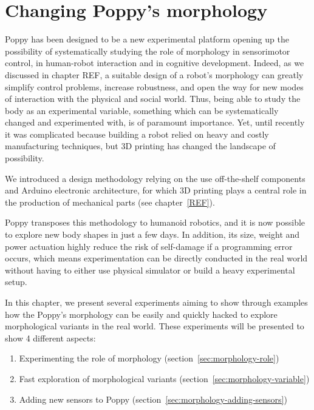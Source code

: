 
\cleartoleftpage



\chapter{Changing Poppy's morphology} %
\label{cha:changing_morphology}


Poppy has been designed to be a new experimental platform opening up the possibility of systematically studying the role of morphology in sensorimotor control, in human-robot interaction and in cognitive development. Indeed, as we discussed in chapter REF, a suitable design of a robot’s morphology can greatly simplify control problems, increase robustness, and open the way for new modes of interaction with the physical and social world. Thus, being able to study the body as an experimental variable, something which can be systematically changed and experimented with, is of paramount importance. Yet, until recently it was complicated because building a robot relied on heavy and costly manufacturing techniques, but 3D printing has changed the landscape of possibility.

We introduced a design methodology relying on the use off-the-shelf components and Arduino electronic architecture, for which 3D printing plays a central role in the production of mechanical parts (see chapter~\ref{REF}).

Poppy transposes this methodology to humanoid robotics, and it is now possible to explore new body shapes in just a few days. In addition, its size, weight and power actuation highly reduce the risk of self-damage if a programming error occurs, which means experimentation can be directly conducted in the real world without having to either use physical simulator or build a heavy experimental setup.

In this chapter, we present several experiments aiming to show through examples how the Poppy's morphology can be easily and quickly hacked  to explore morphological variants in the real world.
These experiments will be presented to show 4 different aspects:

\begin{enumerate}
    \item Experimenting the role of morphology (section~\ref{sec:morphology-role})
    \item Fast exploration of morphological variants (section~\ref{sec:morphology-variable})
    \item Adding new sensors to Poppy (section~\ref{sec:morphology-adding-sensors})
\end{enumerate}



